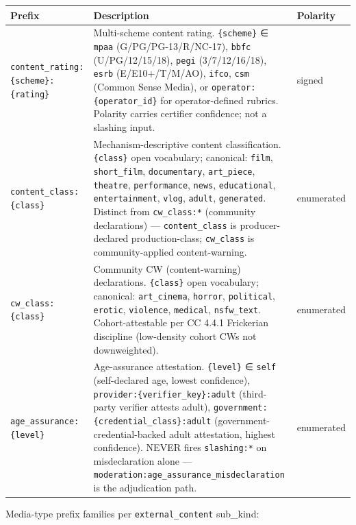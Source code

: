 \documentclass[11pt]{article}
\begin{document}
{\footnotesize
\begin{longtable}{|p{5.33cm}|p{5.33cm}|p{5.33cm}|}\hline
\textbf{Prefix} & \textbf{Description} & \textbf{Polarity} \\ \hline\endhead
\texttt{content\_rating:\{scheme\}:\{rating\}} & Multi-scheme content rating. \texttt{\{scheme\}} ∈ \texttt{mpaa} (G/PG/PG-13/R/NC-17), \texttt{bbfc} (U/PG/12/15/18), \texttt{pegi} (3/7/12/16/18), \texttt{esrb} (E/E10+/T/M/AO), \texttt{ifco}, \texttt{csm} (Common Sense Media), or \texttt{operator:\{operator\_id\}} for operator-defined rubrics. Polarity carries certifier confidence; not a slashing input. & signed \\ \hline
\texttt{content\_class:\{class\}} & Mechanism-descriptive content classification. \texttt{\{class\}} open vocabulary; canonical: \texttt{film}, \texttt{short\_film}, \texttt{documentary}, \texttt{art\_piece}, \texttt{theatre}, \texttt{performance}, \texttt{news}, \texttt{educational}, \texttt{entertainment}, \texttt{vlog}, \texttt{adult}, \texttt{generated}. Distinct from \texttt{cw\_class:*} (community declarations) — \texttt{content\_class} is producer-declared production-class; \texttt{cw\_class} is community-applied content-warning. & enumerated \\ \hline
\texttt{cw\_class:\{class\}} & Community CW (content-warning) declarations. \texttt{\{class\}} open vocabulary; canonical: \texttt{art\_cinema}, \texttt{horror}, \texttt{political}, \texttt{erotic}, \texttt{violence}, \texttt{medical}, \texttt{nsfw\_text}. Cohort-attestable per CC 4.4.1 Frickerian discipline (low-density cohort CWs not downweighted). & enumerated \\ \hline
\texttt{age\_assurance:\{level\}} & Age-assurance attestation. \texttt{\{level\}} ∈ \texttt{self} (self-declared age, lowest confidence), \texttt{provider:\{verifier\_key\}:adult} (third-party verifier attests adult), \texttt{government:\{credential\_class\}:adult} (government-credential-backed adult attestation, highest confidence). NEVER fires \texttt{slashing:*} on misdeclaration alone — \texttt{moderation:age\_assurance\_misdeclaration} is the adjudication path. & enumerated \\ \hline
\end{longtable}}


Media-type prefix families per \texttt{external\_content} sub\_kind:
\end{document}
